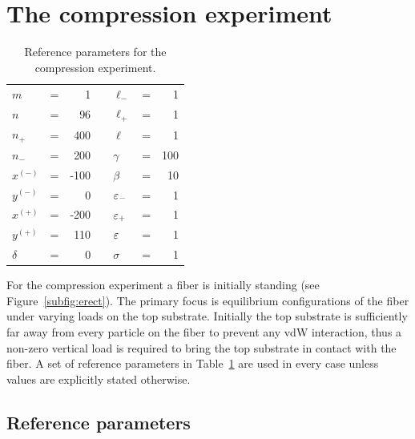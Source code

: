 \section{The compression experiment}

	\begin{table}[th]
		\centering
		\caption{Reference parameters for the compression experiment.\label{table:compression_reference}}
		\begin{tabular}{lcrclcr}
			$m$ & = & 1 & \hspace{1in} & $\ell_-$ & = & 1 \\
			$n$ & = & 96 & & $\ell_+$ & = & 1 \\
			$n_+$ & = & 400 & & $\ell$ & = & 1 \\
			$n_-$ & = & 200 & & $\gamma$ & = & 100 \\
			$x^{(-)}$ & = & -100 & & $\beta$ & = & 10 \\
			$y^{(-)}$ & = & 0 & & $\varepsilon_-$ & = & 1 \\
			$x^{(+)}$ & = & -200 & & $\varepsilon_+$ & = & 1 \\
			$y^{(+)}$ & = & 110 & & $\varepsilon$ & = & 1 \\
			$\delta$ & = & 0 & & $\sigma$ & = & 1
		\end{tabular}
	\end{table}
For the compression experiment a fiber is initially standing (see Figure~\ref{subfig:erect}). The primary focus is equilibrium configurations of the fiber under varying loads on the top substrate. Initially the top substrate is sufficiently far away from every particle on the fiber to prevent any vdW interaction, thus a non-zero vertical load is required to bring the top substrate in contact with the fiber. A set of reference parameters in Table~\ref{table:compression_reference} are used in every case unless values are explicitly stated otherwise.

\subsection{Reference parameters}

